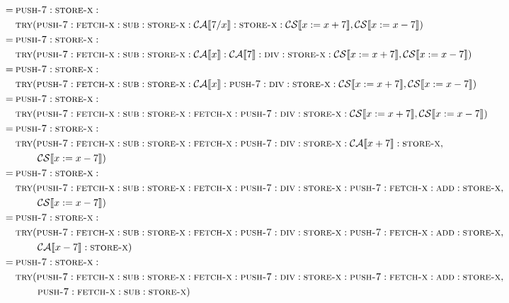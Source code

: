 \documentclass[11pt,oneside,a4paper]{article}
\newenvironment{changemargin}[2]{%
\begin{list}{}{%
\setlength{\topsep}{0pt}%
\setlength{\leftmargin}{#1}%
\setlength{\listparindent}{\parindent}%
\setlength{\itemindent}{\parindent}%
\setlength{\parsep}{\parskip}%
}%
\item[]}{\end{list}}
\newcommand{\SExp}[2]{\mathcal{#1}\llbracket #2 \rrbracket}
\newcommand{\AMIns}[1]{\textsc{#1}}
\begin{document}
\begin{changemargin}{-2.9cm}{\rightmargin}
\begin{align*}
=\: &\AMIns{push-7}:\AMIns{store-x}: \\
&\AMIns{try}(\AMIns{push-7}:\AMIns{fetch-x}:\AMIns{sub}:\AMIns{store-x}:
\SExp{CA}{7 / x}:\AMIns{store-x}:\SExp{CS}{x := x + 7},
\SExp{CS}{x := x - 7}) \\
=\: &\AMIns{push-7}:\AMIns{store-x}: \\
&\AMIns{try}(\AMIns{push-7}:\AMIns{fetch-x}:\AMIns{sub}:\AMIns{store-x}:
\SExp{CA}{x}:\SExp{CA}{7}:\AMIns{div}:\AMIns{store-x}:\SExp{CS}{x := x + 7},
\SExp{CS}{x := x - 7}) \\
=\: &\AMIns{push-7}:\AMIns{store-x}: \\
&\AMIns{try}(\AMIns{push-7}:\AMIns{fetch-x}:\AMIns{sub}:\AMIns{store-x}:
\SExp{CA}{x}:\AMIns{push-7}:\AMIns{div}:\AMIns{store-x}:\SExp{CS}{x := x + 7},
\SExp{CS}{x := x - 7}) \\
=\: &\AMIns{push-7}:\AMIns{store-x}: \\
&\AMIns{try}(\AMIns{push-7}:\AMIns{fetch-x}:\AMIns{sub}:\AMIns{store-x}:
\AMIns{fetch-x}:\AMIns{push-7}:\AMIns{div}:\AMIns{store-x}:\SExp{CS}{x := x + 7},
\SExp{CS}{x := x - 7}) \\
=\: &\AMIns{push-7}:\AMIns{store-x}: \\
&\AMIns{try}(\AMIns{push-7}:\AMIns{fetch-x}:\AMIns{sub}:\AMIns{store-x}:
\AMIns{fetch-x}:\AMIns{push-7}:\AMIns{div}:\AMIns{store-x}:
\SExp{CA}{x + 7}:\AMIns{store-x}, \\
& \quad \quad \: \SExp{CS}{x := x - 7}) \\
=\: &\AMIns{push-7}:\AMIns{store-x}: \\
&\AMIns{try}(\AMIns{push-7}:\AMIns{fetch-x}:\AMIns{sub}:\AMIns{store-x}:
\AMIns{fetch-x}:\AMIns{push-7}:\AMIns{div}:\AMIns{store-x}:
\AMIns{push-7}:\AMIns{fetch-x}:\AMIns{add}:\AMIns{store-x}, \\
& \quad \quad \: \SExp{CS}{x := x - 7}) \\
=\: &\AMIns{push-7}:\AMIns{store-x}: \\
&\AMIns{try}(\AMIns{push-7}:\AMIns{fetch-x}:\AMIns{sub}:\AMIns{store-x}:
\AMIns{fetch-x}:\AMIns{push-7}:\AMIns{div}:\AMIns{store-x}:
\AMIns{push-7}:\AMIns{fetch-x}:\AMIns{add}:\AMIns{store-x}, \\
& \quad \quad \: \SExp{CA}{x - 7}:\AMIns{store-x}) \\
=\: &\AMIns{push-7}:\AMIns{store-x}: \\
&\AMIns{try}(\AMIns{push-7}:\AMIns{fetch-x}:\AMIns{sub}:\AMIns{store-x}:
\AMIns{fetch-x}:\AMIns{push-7}:\AMIns{div}:\AMIns{store-x}:
\AMIns{push-7}:\AMIns{fetch-x}:\AMIns{add}:\AMIns{store-x}, \\
& \quad \quad \: \AMIns{push-7}:\AMIns{fetch-x}:\AMIns{sub}:\AMIns{store-x}) \\
\end{align*}
\end{changemargin}
\end{document}
